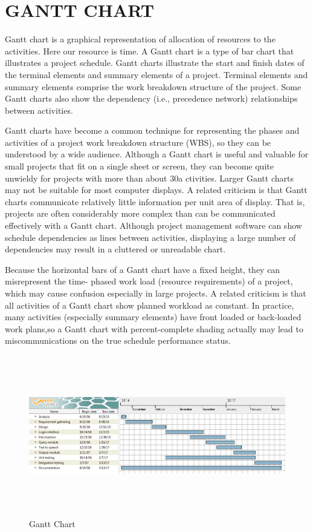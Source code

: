 \documentclass[12pt,a4paper,oneside]{report}
\begin{document}
\section{GANTT CHART}
\par Gantt chart is a graphical representation of allocation of resources to the activities. Here our resource is time. A Gantt chart is a type of bar chart that illustrates a project schedule. Gantt charts illustrate the start and ﬁnish dates of the terminal elements and summary elements of a project. Terminal elements and summary elements comprise the work breakdown structure of the project. Some Gantt charts also show the dependency (i.e., precedence network) relationships between activities. 
\par Gantt charts have become a common technique for representing the phases and activities of a project work breakdown structure (WBS), so they can be understood by a wide audience. Although a Gantt chart is useful and valuable for small projects that ﬁt on a single sheet or screen, they can become quite unwieldy for projects with more than about 30a ctivities. Larger Gantt charts may not be suitable for most computer displays. A related criticism is that Gantt charts communicate relatively little information per unit area of display. That is, projects are often considerably more complex than can be communicated effectively with a Gantt chart. Although project management software can show schedule dependencies as lines between activities, displaying a large number of dependencies may result in a cluttered or unreadable chart. \\
\par Because the horizontal bars of a Gantt chart have a ﬁxed height, they can misrepresent the time- phased work load (resource requirements) of a project, which may cause confusion especially in large projects. A related criticism is that all activities of a Gantt chart show planned workload as constant. In practice, many activities (especially summary elements) have front loaded or back-loaded work plans,so a Gantt chart with percent-complete shading actually may lead to miscommunications on the true schedule performance status.
\begin{figure}[h]
	\begin{center}
		\includegraphics[width=16cm,height=7cm]{abcdgantt.png}
			\caption{Gantt Chart}
			\label{Gantt Chart}
	\end{center}
\end{figure}
\end{document}
